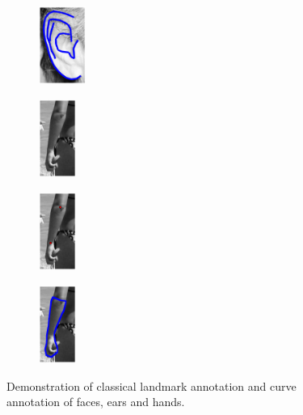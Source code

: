 \begin{figure}[t!]
\begin{subfigure}[b]{0.085\textwidth}
    \end{subfigure}
    \hfill
    \begin{subfigure}[b]{0.085\textwidth}
            \includegraphics[height=2.55cm]{resources/Fig_Intro/intro_1_2}
    \end{subfigure}
    \hfill
    \begin{subfigure}[b]{0.065\textwidth}
            \includegraphics[height=2.55cm]{resources/Fig_Intro/intro_2_0}
    \end{subfigure}
    \hfill
    \begin{subfigure}[b]{0.065\textwidth}
            \includegraphics[height=2.55cm]{resources/Fig_Intro/intro_2_1}
    \end{subfigure}
    \hfill
    \begin{subfigure}[b]{0.065\textwidth}
            \includegraphics[height=2.55cm]{resources/Fig_Intro/intro_2_2}
    \end{subfigure}
    
    \caption{Demonstration of classical landmark annotation and curve annotation of faces, ears and hands.}
    \label{fig:intro}
\end{figure}


